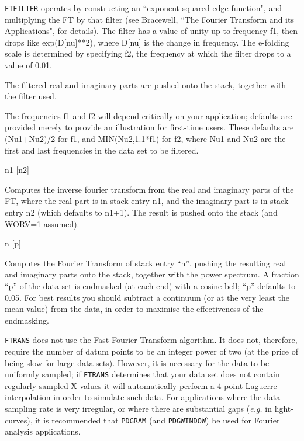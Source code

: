\documentclass[twoside,11pt]{article}
\newcommand{\htmlref}[2]{#1}
\newcommand{\xlabel}[1]{}
\renewcommand{\_}{\texttt{\symbol{95}}}
\newcommand{\dipcom}[3] { \item [{#1}] {#2} \par }
\newcommand{\dipcom}[3] { \end{description}
                            \subsection{\xlabel{#1}{#1} - {#3}}
                            \label{COM:#1}
                            \begin{description}
                            \item [Syntax:] {\tt{#1} {#2}}
                            \par
                            \item [Description:]}
\begin{document}
\begin {description}
\htmlref{{\tt{FTFILTER}}}{COM:FTFILTER}  operates by constructing an ``exponent-squared edge
function", and multiplying the FT by that filter (see Bracewell, ``The
Fourier Transform and its Applications", for details). The filter has
a value of unity up to frequency f1, then drops like exp(D[nu]**2),
where D[nu] is the change in frequency. The e-folding scale is
determined by specifying f2, the frequency at which the filter drops
to a value of 0.01.

The filtered real and imaginary parts are pushed onto the stack,
together with the filter used.

The frequencies f1 and f2 will depend critically on your application;
defaults are provided merely to provide an illustration for first-time
users. These defaults are (Nu1+Nu2)/2 for f1, and MIN(Nu2,1.1*f1) for
f2, where Nu1 and Nu2 are the first and last frequencies in the
data set to be filtered.

\dipcom{FTINV}{n1 [n2]}{Takes the inverse Fourier transform of two stack entries}
Computes the inverse fourier transform from the real and imaginary
parts of the FT, where the real part is in stack entry n1, and the
imaginary part is in stack entry n2 (which defaults to n1+1). The
result is pushed onto the stack (and WORV=1 assumed).

\dipcom{FTRANS}{n [p]}{Takes the forward Fourier transform of a stack entry}
Computes the Fourier Transform of stack entry ``n'', pushing the
resulting real and imaginary parts onto the stack, together with the
power spectrum. A fraction ``p'' of the data set is endmasked (at each
end) with a cosine bell; ``p'' defaults to 0.05. For best results you
should subtract a continuum (or at the very least the mean value) from
the data, in order to maximise the effectiveness of the endmasking.

\htmlref{{\tt{FTRANS}}}{COM:FTRANS}  does not use the Fast Fourier Transform algorithm. It does not,
therefore, require the number of datum points to be an integer power
of two (at the price of being slow for large data sets). However, it is
necessary for the data to be uniformly sampled; if \htmlref{{\tt{FTRANS}}}{COM:FTRANS}  determines
that your data set does not contain regularly sampled X values it will
automatically perform a 4-point Laguerre interpolation in order to
simulate such data. For applications where the data sampling rate is
very irregular, or where there are substantial gaps ({\em e.g.} in
light-curves), it is recommended that \htmlref{{\tt{PDGRAM}}}{COM:PDGRAM}  (and \htmlref{{\tt{PDGWINDOW}}}{COM:PDGWINDOW})  be used
for Fourier analysis applications.


\end{description}
\end{document}
